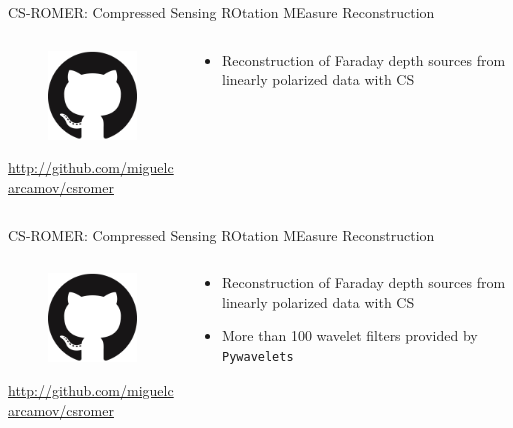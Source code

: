 \documentclass[xetex,aspectratio=169]{beamer}
\begin{document}
\begin{frame}{CS-ROMER: Compressed Sensing ROtation MEasure Reconstruction}
	\begin{columns}[onlytextwidth,t]
		\begin{column}{.5\textwidth}
			\begin{figure}
				\centering
				\includegraphics[scale=0.5]{figures/logos/GitHub-Mark-120px-plus.png}
			\end{figure}

			\url{http://github.com/miguelcarcamov/csromer}
		\end{column}
		\begin{column}{.5\textwidth}
			\begin{itemize}
				\item Reconstruction of Faraday depth sources from linearly polarized data with CS

			\end{itemize}
		\end{column}%

	\end{columns}
\end{frame}

\begin{frame}{CS-ROMER: Compressed Sensing ROtation MEasure Reconstruction}
	\begin{columns}[onlytextwidth,t]
		\begin{column}{.5\textwidth}
			\begin{figure}
				\centering
				\includegraphics[scale=0.5]{figures/logos/GitHub-Mark-120px-plus.png}
			\end{figure}

			\url{http://github.com/miguelcarcamov/csromer}
		\end{column}
		\begin{column}{.5\textwidth}
			\begin{itemize}
				\item Reconstruction of Faraday depth sources from linearly polarized data with CS
				\item More than 100 wavelet filters provided by {\tt Pywavelets}

			\end{itemize}
		\end{column}%

	\end{columns}
\end{frame}
\end{document}
